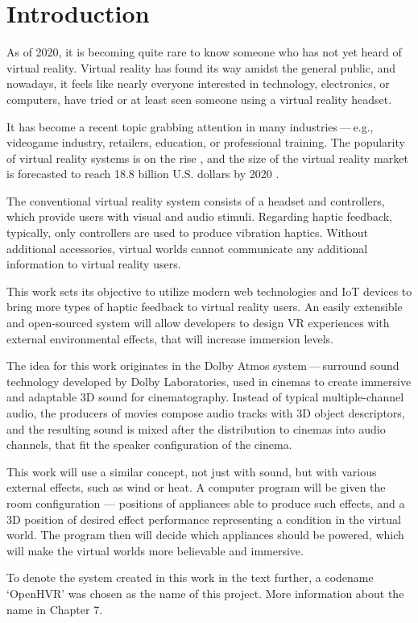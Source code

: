 \chapter{Introduction}

\vspace{8em}

As of 2020, it is becoming quite rare to know someone who has not yet heard
of virtual reality. Virtual reality has found its way amidst the general public,
and nowadays, it feels like nearly everyone interested in technology,
electronics, or computers, have tried or at least seen someone using a virtual
reality headset.

It has become a recent topic grabbing attention in many industries — e.g.,
videogame industry, retailers, education, or professional training. The popularity
of virtual reality systems is on the rise \cite{shipments}, and the size
of the virtual reality market is forecasted to reach 18.8 billion U.S. dollars
by 2020 \cite{vrmsize}.

The conventional virtual reality system consists of a headset and controllers,
which provide users with visual and audio stimuli. Regarding haptic feedback,
typically, only controllers are used to produce vibration haptics. Without
additional accessories, virtual worlds cannot communicate any additional
information to virtual reality users.

This work sets its objective to utilize modern web technologies and IoT
devices to bring more types of haptic feedback to virtual reality users.
An easily extensible and open-sourced system will allow developers to design
VR experiences with external environmental effects, that will increase
immersion levels.

The idea for this work originates in the Dolby Atmos system — surround sound
technology developed by Dolby Laboratories, used in cinemas to create
immersive and adaptable 3D sound for cinematography. Instead of typical
multiple-channel audio, the producers of movies compose audio tracks with
3D object descriptors, and the resulting sound is mixed after the distribution
to cinemas into audio channels, that fit the speaker configuration
of the cinema.\cite{dawp}

This work will use a similar concept, not just with sound, but with various
external effects, such as wind or heat. A computer program will be given
the room configuration — positions of appliances able to produce such effects,
and a 3D position of desired effect performance representing a condition
in the virtual world. The program then will decide which appliances should
be powered, which will make the virtual worlds more believable and immersive.

To denote the system created in this work in the text further, a codename
`OpenHVR' was chosen as the name of this project. More information about
the name in Chapter 7.

